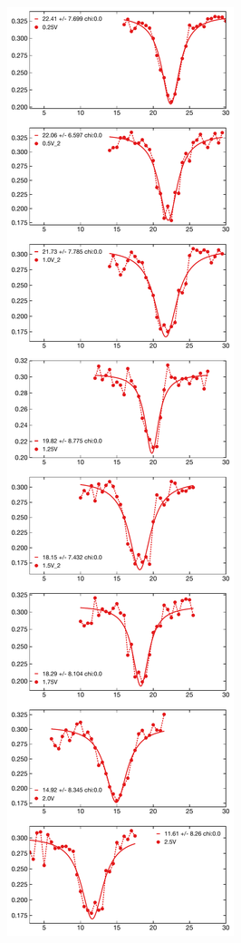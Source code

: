 \documentclass[bibnotes]{article}
\begin{document}
		\begin{figure}
		\centering
		\label{fig:qz}
		\begin{subfigure}{0.4\linewidth}
		    \includegraphics[scale=0.4]{figures/qz_spectrum.pdf}

\end{subfigure}
\end{figure}
\end{document}
